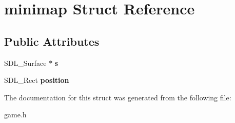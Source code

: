 \hypertarget{structminimap}{}\section{minimap Struct Reference}
\label{structminimap}
\subsection*{Public Attributes}
\begin{DoxyCompactItemize}
\item 
\mbox{\label{structminimap_ab2fb06cf5434216b5903b82f1565c29c}} 
S\+D\+L\+\_\+\+Surface $\ast$ {\bfseries s}
\item 
\mbox{\label{structminimap_a604bf8120118e8a02063a8e477f37da3}} 
S\+D\+L\+\_\+\+Rect {\bfseries position}
\end{DoxyCompactItemize}


The documentation for this struct was generated from the following file\+:\begin{DoxyCompactItemize}
\item 
game.\+h\end{DoxyCompactItemize}
